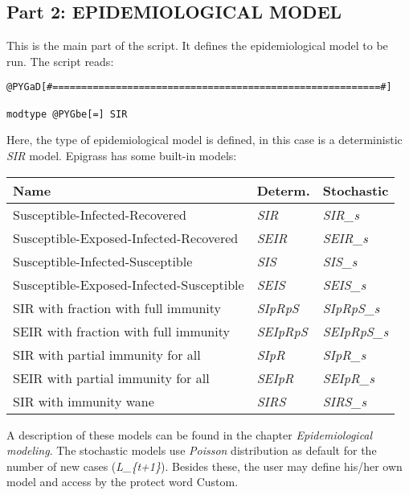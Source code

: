 \documentclass[a4paper,10pt]{manual}
\begin{document}
\subsection{Part 2: EPIDEMIOLOGICAL MODEL}

This is the main part of the script. It defines the epidemiological model to be run.
The script reads:

\begin{Verbatim}[commandchars=@\[\]]
@PYGaD[#=========================================================#]

modtype @PYGbe[=] SIR
\end{Verbatim}

Here, the type of epidemiological model is defined, in this case is a deterministic \emph{SIR} model. Epigrass has some built-in models:

\begin{tabulary}{\textwidth}{|L|L|L|}
\hline
\textbf{
Name
} & \textbf{
Determ.
} & \textbf{
Stochastic
}\\
\hline

Susceptible-Infected-Recovered
 & 
\emph{SIR}
 & 
\emph{SIR\_s}
\\

Susceptible-Exposed-Infected-Recovered
 & 
\emph{SEIR}
 & 
\emph{SEIR\_s}
\\

Susceptible-Infected-Susceptible
 & 
\emph{SIS}
 & 
\emph{SIS\_s}
\\

Susceptible-Exposed-Infected-Susceptible
 & 
\emph{SEIS}
 & 
\emph{SEIS\_s}
\\

SIR with fraction with full immunity
 & 
\emph{SIpRpS}
 & 
\emph{SIpRpS\_s}
\\

SEIR with fraction with full immunity
 & 
\emph{SEIpRpS}
 & 
\emph{SEIpRpS\_s}
\\

SIR with partial immunity for all
 & 
\emph{SIpR}
 & 
\emph{SIpR\_s}
\\

SEIR with partial immunity for all
 & 
\emph{SEIpR}
 & 
\emph{SEIpR\_s}
\\

SIR with immunity wane
 & 
\emph{SIRS}
 & 
\emph{SIRS\_s}
\\
\hline
\end{tabulary}


A description of these models can be found in the chapter \emph{Epidemiological modeling}. The stochastic models use \emph{Poisson} distribution as default for the number of new cases (\emph{L\_\{t+1\}}). Besides these, the user may define his/her own model and access by the protect word Custom.
\end{document}
